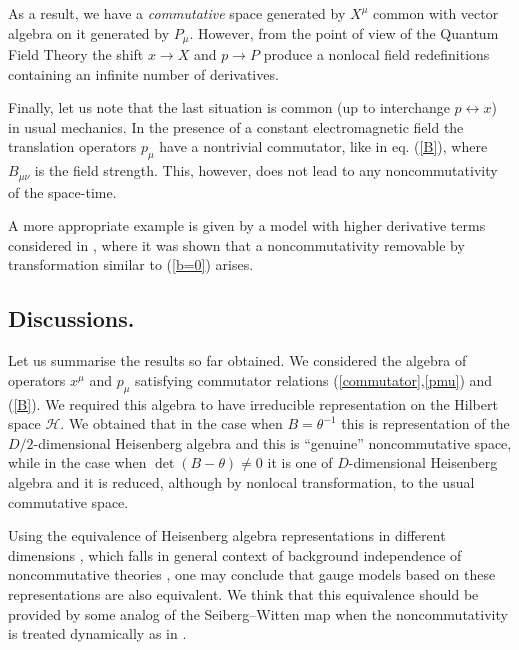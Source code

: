 \documentclass[a4paper]{amsart}
\newcommand{\hh}{\mathcal{H}}
\begin{document}
As a result, we have a \emph{commutative} space generated by
$X^\mu$ common with vector algebra on it generated by $P_\mu$.
However, from the point of view of the Quantum Field Theory the
shift $x\rightarrow X$ and $p\rightarrow P$ produce a nonlocal
field redefinitions containing an infinite number of derivatives.

Finally, let us note that the last situation is common (up to interchange
$p\leftrightarrow x$) in usual mechanics. In the presence of a constant
electromagnetic field the translation operators $p_\mu$ have a nontrivial
commutator, like in eq. (\ref{B}), where $B_{\mu\nu}$ is the field strength. This,
however, does not lead to any noncommutativity of the space-time.

A more appropriate example is given by a model with higher derivative terms
considered in \cite{Lukierski:1997br}, where it was shown that a noncommutativity
removable by transformation similar to (\ref{b=0}) arises.

\subsection*{Discussions.} Let us summarise the results so far obtained. We
considered the algebra of operators $x^\mu$ and $p_\mu$ satisfying
commutator relations (\ref{commutator},\ref{pmu}) and (\ref{B}).
We required this algebra to have irreducible representation on the
Hilbert space $\hh$. We obtained that in the case when
$B=\theta^{-1}$ this is representation of the $D/2$-dimensional
Heisenberg algebra and this is ``genuine'' noncommutative space,
while in the case when $\det(B-\theta)\neq 0$ it is one of
$D$-dimensional Heisenberg algebra and it is reduced, although by
nonlocal transformation, to the usual commutative space.

Using the equivalence of Heisenberg algebra representations in
different dimensions \cite{Sochichiu:2000bg}, which falls in
general context of background independence of noncommutative
theories \cite{Seiberg:2000zk}, one may conclude that gauge models
based on these representations are also equivalent. We think that
this equivalence should be provided by some analog of the
Seiberg--Witten map \cite{Seiberg:1999vs} when the
noncommutativity is treated dynamically as in
\cite{Harvey:2000jt,Sochichiu:2000rm,Gopakumar:2000xx}.
\end{document}
